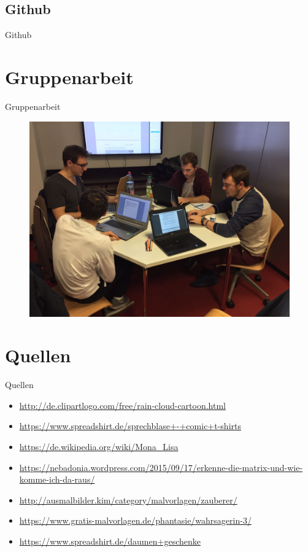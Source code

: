 \documentclass[19pt]{beamer}
\begin{document}
\subsection{Github}
\begin{frame}{Github}
\end{frame}

\section{Gruppenarbeit}
\begin{frame}{Gruppenarbeit}
	\begin{figure}
		\begin{center}
			\includegraphics[scale=0.16]{resources/Gruppenarbeit} 
		\end{center}
	\end{figure}	 
\end{frame}

\section{Quellen}
\begin{frame}{Quellen}
	\begin{itemize}
		\item \url{http://de.clipartlogo.com/free/rain-cloud-cartoon.html}
		\item \url{https://www.spreadshirt.de/sprechblase+-+comic+t-shirts}
		\item \url{https://de.wikipedia.org/wiki/Mona_Lisa}
		\item \url{https://nebadonia.wordpress.com/2015/09/17/erkenne-die-matrix-und-wie-komme-ich-da-raus/}
		\item \url{http://ausmalbilder.kim/category/malvorlagen/zauberer/}
		\item \url{https://www.gratis-malvorlagen.de/phantasie/wahrsagerin-3/}
		\item \url{https://www.spreadshirt.de/daumen+geschenke}
	\end{itemize}
\end{frame}
\end{document}
